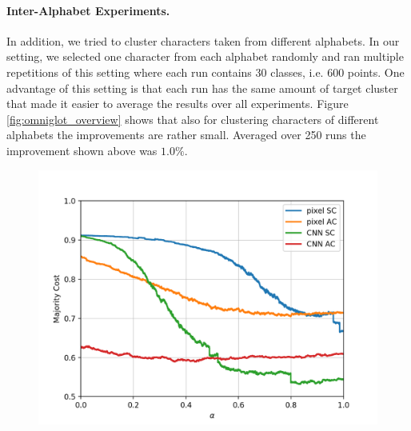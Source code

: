 \paragraph{Inter-Alphabet Experiments.} In addition, we tried to cluster characters taken from different alphabets. In our setting, we selected one character from each alphabet randomly and ran multiple repetitions of this setting where each run contains 30 classes, i.e. 600 points. One advantage of this setting is that each run has the same amount of target cluster that made it easier to average the results over all experiments. Figure \ref{fig:omniglot_overview} shows that also for clustering characters of different alphabets the improvements are rather small. Averaged over 250 runs the improvement shown above was $1.0\%$.

\begin{figure}[H]
  \centering
  \begin{minipage}{.45\textwidth}
  \centering
  {\includegraphics[width=\linewidth]{plots/omniglot_all}}
\end{minipage}\quad
\begin{minipage}{.45\textwidth}
  \centering

\end{minipage}
\end{figure}

